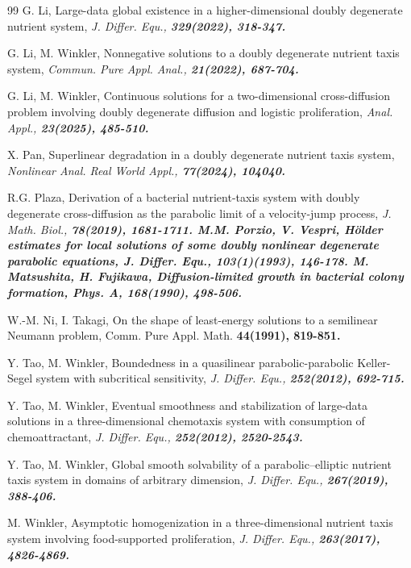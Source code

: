 \documentclass[12pt]{article}
\theoremstyle{plain}
\theoremstyle{definition}
\numberwithin{equation}{section}
\begin{document}
\begin{thebibliography}{99}
 G. Li, Large-data global existence in a higher-dimensional doubly degenerate nutrient system,  \it J. Differ. Equ.,
    \bf329\rm(2022), 318-347.

 G. Li, M. Winkler, Nonnegative solutions to a doubly degenerate nutrient taxis system, \it Commun. Pure Appl. Anal.,
    \bf21\rm(2022), 687-704.

 G. Li, M. Winkler, Continuous solutions for a two-dimensional cross-diffusion problem involving doubly degenerate diffusion and logistic proliferation, \it Anal. Appl., \bf23\rm(2025), 485-510.

 X. Pan, Superlinear degradation in a doubly degenerate nutrient taxis system, \it Nonlinear Anal. Real World Appl., \bf 77\rm(2024), 104040.

 R.G. Plaza, Derivation of a bacterial nutrient-taxis system with doubly degenerate cross-diffusion as the parabolic limit of a velocity-jump process, \it J. Math. Biol., \bf 78\rm(2019), 1681-1711.
 M.M. Porzio, V. Vespri, H\"{o}lder estimates for local solutions of some doubly nonlinear degenerate parabolic equations, \it J. Differ. Equ., \bf103(1)\rm(1993), 146-178.
M. Matsushita, H. Fujikawa, Diffusion-limited growth in bacterial colony formation, Phys. A, \bf168\rm(1990), 498-506.

W.-M. Ni, I. Takagi, On the shape of least-energy solutions to a semilinear Neumann problem, Comm. Pure Appl. Math. \bf44\rm(1991), 819-851.

 Y. Tao, M. Winkler, Boundedness in a quasilinear parabolic-parabolic Keller-Segel system with subcritical sensitivity, \it J.  Differ. Equ., \bf252\rm(2012), 692-715.

 Y. Tao, M. Winkler, Eventual smoothness and stabilization of large-data solutions in a three-dimensional chemotaxis system with  consumption of chemoattractant, \it J. Differ. Equ., \bf 252\rm(2012), 2520-2543.

 Y. Tao, M. Winkler, Global smooth solvability of a parabolic--elliptic nutrient taxis system in domains of arbitrary dimension, \it J. Differ. Equ., \bf 267\rm(2019), 388-406.

    M. Winkler, Asymptotic homogenization in a three-dimensional nutrient taxis system involving food-supported
proliferation, \it J. Differ. Equ., \bf263\rm(2017), 4826-4869.


\end{thebibliography}
\end{document}
